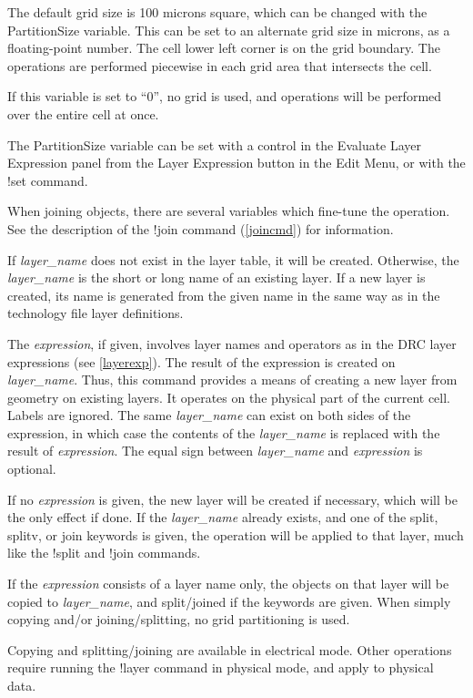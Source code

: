 The default grid size is 100 microns square, which can be changed
with the {\et PartitionSize} variable.  This can be set to an
alternate grid size in microns, as a floating-point number.  The cell
lower left corner is on the grid boundary.  The operations are
performed piecewise in each grid area that intersects the cell.

If this variable is set to ``0'', no grid is used, and operations 
will be performed over the entire cell at once.

The {\et PartitionSize} variable can be set with a control in the {\cb
Evaluate Layer Expression} panel from the {\cb Layer Expression}
button in the {\cb Edit Menu}, or with the {\cb !set} command.

When joining objects, there are several variables which fine-tune the
operation.  See the description of the {\cb !join} command
(\ref{joincmd}) for information.

If {\it layer\_name} does not exist in the layer table, it will be
created.  Otherwise, the {\it layer\_name} is the short or long name
of an existing layer.  If a new layer is created, its name is
generated from the given name in the same way as in the technology
file layer definitions.

The {\it expression}, if given, involves layer names and operators as
in the DRC layer expressions (see \ref{layerexp}).  The result of the
expression is created on {\it layer\_name}.  Thus, this command
provides a means of creating a new layer from geometry on existing
layers.  It operates on the physical part of the current cell.  Labels
are ignored.  The same {\it layer\_name} can exist on both sides of
the expression, in which case the contents of the {\it layer\_name} is
replaced with the result of {\it expression}.  The equal sign between
{\it layer\_name} and {\it expression} is optional.

If no {\it expression} is given, the new layer will be created if
necessary, which will be the only effect if done.  If the {\it
layer\_name} already exists, and one of the {\vt split}, {\vt splitv},
or {\vt join} keywords is given, the operation will be applied to that
layer, much like the {\cb !split} and {\cb !join} commands.

If the {\it expression} consists of a layer name only, the objects on
that layer will be copied to {\it layer\_name}, and split/joined if
the keywords are given.  When simply copying and/or joining/splitting,
no grid partitioning is used.

Copying and splitting/joining are available in electrical mode.  Other
operations require running the {\cb !layer} command in physical mode,
and apply to physical data.

